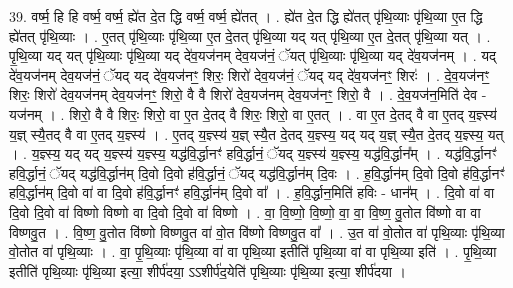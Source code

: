\documentclass[17pt]{extarticle}
\begin{document}
39. वर्ष्म॒ हि हि वर्ष्म॒ वर्ष्म॒ ह्ये॑त दे॒त द्धि वर्ष्म॒ वर्ष्म॒ ह्ये॑तत् । . ह्ये॑त दे॒त द्धि ह्ये॑तत् पृ॑थि॒व्याः पृ॑थि॒व्या ए॒त द्धि ह्ये॑तत् पृ॑थि॒व्याः । . ए॒तत् पृ॑थि॒व्याः पृ॑थि॒व्या ए॒त दे॒तत् पृ॑थि॒व्या यद् यत् पृ॑थि॒व्या ए॒त दे॒तत् पृ॑थि॒व्या यत् । . पृ॒थि॒व्या यद् यत् पृ॑थि॒व्याः पृ॑थि॒व्या यद् दे॑व॒यज॑नम् देव॒यज॑नं॒ ॅयत् पृ॑थि॒व्याः पृ॑थि॒व्या यद् दे॑व॒यज॑नम् । . यद् दे॑व॒यज॑नम् देव॒यज॑नं॒ ॅयद् यद् दे॑व॒यज॑नꣳ॒॒ शिरः॒ शिरो॑ देव॒यज॑नं॒ ॅयद् यद् दे॑व॒यज॑नꣳ॒॒ शिरः॑ । . दे॒व॒यज॑नꣳ॒॒ शिरः॒ शिरो॑ देव॒यज॑नम् देव॒यज॑नꣳ॒॒ शिरो॒ वै वै शिरो॑ देव॒यज॑नम् देव॒यज॑नꣳ॒॒ शिरो॒ वै । . दे॒व॒यज॑न॒मिति॑ देव - यज॑नम् । . शिरो॒ वै वै शिरः॒ शिरो॒ वा ए॒त दे॒तद् वै शिरः॒ शिरो॒ वा ए॒तत् । . वा ए॒त दे॒तद् वै वा ए॒तद् य॒ज्ञ्स्य॑ य॒ज्ञ् स्यै॒तद् वै वा ए॒तद् य॒ज्ञ्स्य॑ । . ए॒तद् य॒ज्ञ्स्य॑ य॒ज्ञ् स्यै॒त दे॒तद् य॒ज्ञ्स्य॒ यद् यद् य॒ज्ञ् स्यै॒त दे॒तद् य॒ज्ञ्स्य॒ यत् । . य॒ज्ञ्स्य॒ यद् यद् य॒ज्ञ्स्य॑ य॒ज्ञ्स्य॒ यद्ध॑वि॒र्द्धानꣳ॑ हवि॒र्द्धानं॒ ॅयद् य॒ज्ञ्स्य॑ य॒ज्ञ्स्य॒ यद्ध॑वि॒र्द्धान᳚म् । . यद्ध॑वि॒र्द्धानꣳ॑ हवि॒र्द्धानं॒ ॅयद् यद्ध॑वि॒र्द्धान॑म् दि॒वो दि॒वो ह॑वि॒र्द्धानं॒ ॅयद् 
यद्ध॑वि॒र्द्धान॑म् दि॒वः । . ह॒वि॒र्द्धान॑म् दि॒वो दि॒वो ह॑वि॒र्द्धानꣳ॑ हवि॒र्द्धान॑म् दि॒वो वा॑ वा दि॒वो ह॑वि॒र्द्धानꣳ॑ हवि॒र्द्धान॑म् दि॒वो वा᳚ । . ह॒वि॒र्द्धान॒मिति॑ हविः - धान᳚म् । . दि॒वो वा॑ वा दि॒वो दि॒वो वा॑ विष्णो विष्णो वा दि॒वो दि॒वो वा॑ विष्णो । . वा॒ वि॒ष्णो॒ वि॒ष्णो॒ वा॒ वा॒ वि॒ष्ण॒ वु॒तोत वि॑ष्णो वा वा विष्णवु॒त । . वि॒ष्ण॒ वु॒तोत वि॑ष्णो विष्णवु॒त वा॑ वो॒त वि॑ष्णो विष्णवु॒त वा᳚ । . उ॒त वा॑ वो॒तोत वा॑ पृथि॒व्याः पृ॑थि॒व्या वो॒तोत वा॑ पृथि॒व्याः । . वा॒ पृ॒थि॒व्याः पृ॑थि॒व्या वा॑ वा पृथि॒व्या इतीति॑ पृथि॒व्या वा॑ वा पृथि॒व्या इति॑ । . पृ॒थि॒व्या इतीति॑ पृथि॒व्याः पृ॑थि॒व्या इत्या॒ शीर्प॑दया॒ ऽऽशीर्प॑द॒येति॑ पृथि॒व्याः पृ॑थि॒व्या इत्या॒ शीर्प॑दया । \newline
\pagebreak
{}
\end{document}
